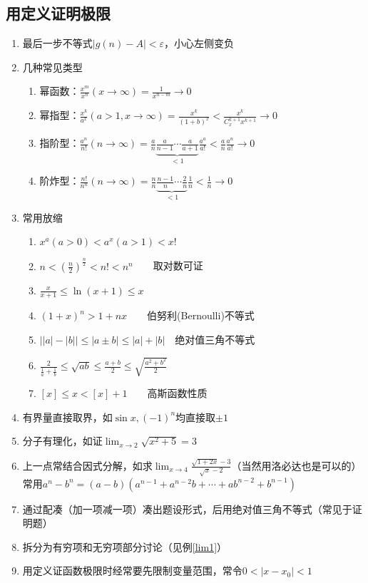 \subsection{用定义证明极限}
\begin{enumerate}
	\item 最后一步不等式$|g(n)-A|<\varepsilon$，小心左侧变负
	\item 几种常见类型
	\begin{enumerate}
		\item 幂函数：$\displaystyle\frac{x^m}{x^n}(x\to\infty)=\frac{1}{x^{n-m}}\to 0$
		\item 幂指型：$\displaystyle\frac{x^k}{a^x}(a>1,x\to\infty)=\frac{x^k}{(1+b)^x}<\frac{x^k}{C_x^{k+1}x^{k+1}}\to 0$
		\item 指阶型：$\displaystyle\frac{a^n}{n!}(n\to\infty)=\frac{a}{n}\underbrace{\frac{a}{n-1}\cdots\frac{a}{a+1}}_{<1}\frac{a^a}{a!}<\frac{a}{n}\frac{a^n}{a!}\to 0$
		\item 阶炸型：$\displaystyle\frac{n!}{n^n}(n\to\infty)=\frac{n}{n}\underbrace{\frac{n-1}{n}\cdots\frac{2}{n}}_{<1}\frac{1}{n}<\frac{1}{n}\to 0$
	\end{enumerate}
	\item 常用放缩
	\begin{enumerate}
		\item $x^a(a>0)<a^x(a>1)<x!$
		\item $\displaystyle n<(\frac{n}{2})^{\frac{n}{2}}<n!<n^n\qquad$取对数可证
		\item $\displaystyle \frac{x}{x+1}\leq\ln(x+1)\leq x$
		\item $\displaystyle (1+x)^n>1+nx\qquad$伯努利(Bernoulli)不等式
		\item $\Big||a|-|b|\Big|\leq|a\pm b|\leq|a|+|b|\quad$绝对值三角不等式
		\item $\displaystyle \frac{2}{\frac{1}{a}+\frac{1}{b}}\leq\sqrt{ab}\leq\frac{a+b}{2}\leq\sqrt{\frac{a^2+b^2}{2}}$
		\item $[x]\leq x<[x]+1\qquad$高斯函数性质
	\end{enumerate}
	\item 有界量直接取界，如$\sin x,(-1)^n$均直接取$\pm 1$
	\item 分子有理化，如证$\displaystyle\lim_{x\to 2}\sqrt{x^2+5}=3$
	\item 上一点常结合因式分解，如求$\displaystyle\lim_{x\to 4}\frac{\sqrt{1+2x}-3}{\sqrt{x}-2}$（当然用洛必达也是可以的）\\
		常用$a^n-b^n=(a-b)(a^{n-1}+a^{n-2}b+\cdots+ab^{n-2}+b^{n-1})$
	\item 通过配凑（加一项减一项）凑出题设形式，后用绝对值三角不等式（常见于证明题）
	\item 拆分为有穷项和无穷项部分讨论（见例\ref{lim1}）
	\item 用定义证函数极限时经常要先限制变量范围，常令$0<|x-x_0|<1$
\end{enumerate}
